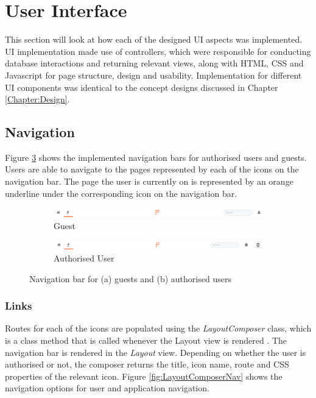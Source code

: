 \section{User Interface}
This section will look at how each of the designed UI aspects was implemented. UI implementation made use of controllers, which were responsible for conducting database interactions and returning relevant views, along with HTML, CSS and Javascript for page structure, design and usability. Implementation for different UI components was identical to the concept designs discussed in Chapter \ref{Chapter:Design}.

\subsection{Navigation}
Figure \ref{fig:NavImplementation} shows the implemented navigation bars for authorised users and guests. Users are able to navigate to the pages represented by each of the icons on the navigation bar. The page the user is currently on is represented by an orange underline under the corresponding icon on the navigation bar.

\begin{figure}[H]
    \centering
    \begin{subfigure}{1\linewidth}
        \includegraphics[width=1\textwidth]{Images/Design/nav-unauthorised}
        \caption{Guest}
        \label{fig:NavUnauth}
    \end{subfigure}
    \begin{subfigure}{1\linewidth}
        \includegraphics[width=1\textwidth]{Images/Design/nav-authorised}
        \caption{Authorised User}
        \label{fig:NavAuth}
    \end{subfigure}
    \caption{Navigation bar for (a) guests and (b) authorised users}
    \label{fig:NavImplementation}
\end{figure}

\subsubsection{Links}
Routes for each of the icons are populated using the \textit{LayoutComposer} class, which is a class method that is called whenever the Layout view is rendered \cite{Laravel:Views}. The navigation bar is rendered in the \emph{Layout} view. Depending on whether the user is authorised or not, the composer returns the title, icon name, route and CSS properties of the relevant icon. Figure \ref{fig:LayoutComposerNav} shows the navigation options for user and application navigation.

